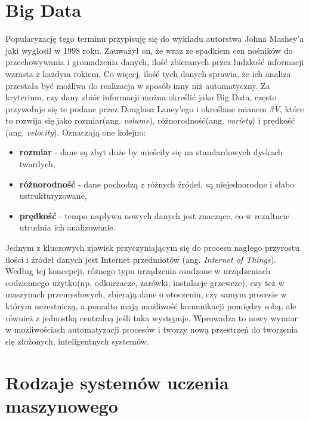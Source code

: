\section{Big Data}

Popularyzację tego terminu przypisuję się do wykładu autorstwa Johna Mashey'a\cite{mashey} jaki wygłosił w 1998 roku. Zauważył on, że wraz ze spadkiem cen nośników do przechowywania i gromadzenia danych, ilość zbieranych przez ludzkość informacji wzrasta z każdym rokiem. Co więcej, ilość tych danych sprawia, że ich analiza przestała być możliwa do realizacja w sposób inny niż automatyczny. Za kryterium, czy dany zbiór informacji można określić jako Big Data, często przywołuje się te podane przez Douglasa Laney'ego\cite{laney} i określane mianem \textit{3V}, które to rozwija się jako rozmiar(ang. \textit{volume}), różnorodność(ang. \textit{variety}) i prędkość (ang. \textit{velocity}). Oznaczają one kolejno:
\begin{itemize}
	\item \textbf{rozmiar} - dane są zbyt duże by mieściły się na standardowych dyskach twardych,
	\item \textbf{różnorodność} - dane pochodzą z różnych źródeł, są niejednorodne i słabo ustrukturyzowane,
	\item \textbf{prędkość} - tempo napływu nowych danych jest znaczące, co w rezultacie utrudnia ich analizowanie.
\\
\end{itemize}

Jednym z kluczowych zjawisk przyczyniającym się do procesu nagłego przyrostu ilości i źródeł danych jest Internet przedmiotów (ang. \textit{Internet of Things}\cite{iot}). Według tej koncepcji, różnego typu urządzenia osadzone w urządzeniach codziennego użytku(np. odkurzacze, żarówki, instalacje grzewcze), czy też w maszynach przemysłowych, zbierają dane o otoczeniu, czy samym procesie w którym uczestniczą, a ponadto mają możliwość komunikacji pomiędzy sobą, ale również z jednostką centralną jeśli taka występuje. Wprowadza to nowy wymiar w możliwościach automatyzacji procesów i tworzy nową przestrzeń do tworzenia się złożonych, inteligentnych systemów.

\section{Rodzaje systemów uczenia maszynowego}

